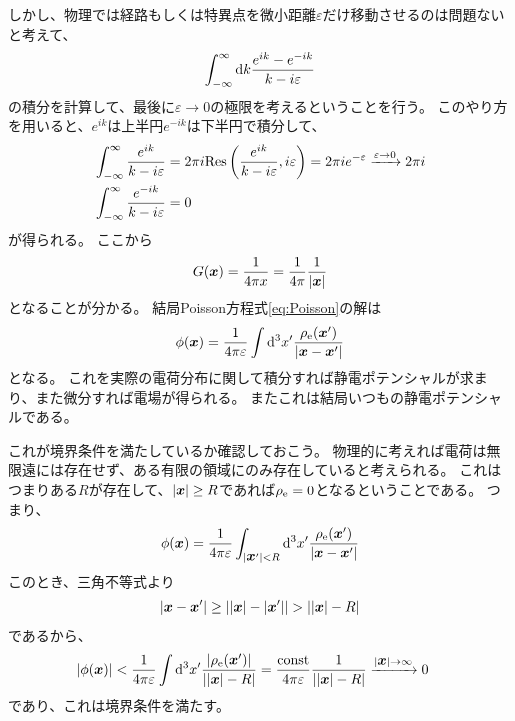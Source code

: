 \documentclass[a4paper]{jsarticle}
\def\vec#1{\mbox{\boldmath $#1$}}
\newcommand{\ddif}{{\rm d}}
\begin{document}
しかし、物理では経路もしくは特異点を微小距離$\varepsilon$だけ移動させるのは問題ないと考えて、
\begin{align}
	\int_{-\infty}^{\infty} \ddif k \frac{e^{ik} - e^{-ik}}{k - i\varepsilon}
\end{align}
の積分を計算して、最後に$\varepsilon \to 0$の極限を考えるということを行う。
このやり方を用いると、$e^{ik}$は上半円$e^{-ik}$は下半円で積分して、
\begin{align}
	&\int_{-\infty}^{\infty} \frac{e^{ik}}{k - i\varepsilon}
	= 2\pi i {\rm Res}\left( \frac{e^{ik}}{k - i\varepsilon}, i\varepsilon \right)
	= 2\pi i e^{-\varepsilon} \xrightarrow{\varepsilon \to 0} 2\pi i \\
	&\int_{-\infty}^{\infty} \frac{e^{-ik}}{k - i\varepsilon} = 0
\end{align}
が得られる。
ここから
\begin{align}
	G(\vec{x}) = \frac{1}{4\pi x} = \frac{1}{4\pi} \frac{1}{|\vec{x}|}
\end{align}
となることが分かる。
結局Poisson方程式\eqref{eq:Poisson}の解は
\begin{align}
	\phi(\vec{x}) = \frac{1}{4 \pi \varepsilon} \int \ddif^3 x^{\prime} \frac{\rho_{\rm e}(\vec{x}^{\prime})}{|\vec{x} - \vec{x}^{\prime}|}
\end{align}
となる。
これを実際の電荷分布に関して積分すれば静電ポテンシャルが求まり、また微分すれば電場が得られる。
またこれは結局いつもの静電ポテンシャルである。

これが境界条件を満たしているか確認しておこう。
物理的に考えれば電荷は無限遠には存在せず、ある有限の領域にのみ存在していると考えられる。
これはつまりある$R$が存在して、$|\vec{x}| \ge R$であれば$\rho_{\rm e}=0$となるということである。
つまり、
\begin{align}
	\phi(\vec{x}) = \frac{1}{4\pi\varepsilon} \int_{|\vec{x}^{\prime}| < R} \ddif^3 x^{\prime} \frac{\rho_{\rm e}(\vec{x}^{\prime})}{|\vec{x} - \vec{x}^{\prime}|}
\end{align}
このとき、三角不等式より
\begin{align}
	|\vec{x} - \vec{x}^{\prime}| \ge ||\vec{x}| - |\vec{x}^{\prime}|| > ||\vec{x}| - R|
\end{align}
であるから、
\begin{align}
	|\phi(\vec{x})| &< \frac{1}{4\pi\varepsilon} \int \ddif^3 x^{\prime} \frac{|\rho_{\rm e}(\vec{x}^{\prime})|}{||\vec{x}| - R|}
	= \frac{\rm const}{4\pi \varepsilon} \frac{1}{||\vec{x}| - R|}
	\xrightarrow{|\vec{x}| \to \infty} 0
\end{align}
であり、これは境界条件を満たす。
\end{document}
